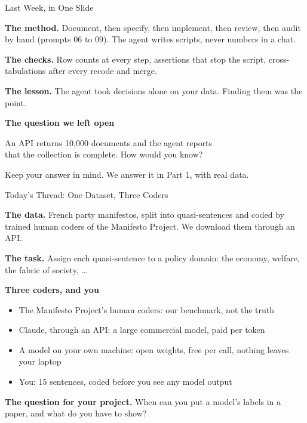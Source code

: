 
\begin{frame}{Last Week, in One Slide}

\small
\textbf{The method.} Document, then specify, then implement, then review, then audit by hand (prompts 06 to 09). The agent writes scripts, never numbers in a chat.

\vspace{0.25cm}

\textbf{The checks.} Row counts at every step, assertions that stop the script, cross-tabulations after every recode and merge.

\vspace{0.25cm}

\textbf{The lesson.} The agent took decisions alone on your data. Finding them was the point.

\vspace{0.5cm}

\textbf{The question we left open}

\vspace{0.15cm}
\centering
\alert{An API returns 10,000 documents and the agent reports\\ that the collection is complete. How would you know?}

\vspace{0.2cm}
{\small Keep your answer in mind. We answer it in Part 1, with real data.}

\end{frame}

\begin{frame}{Today's Thread: One Dataset, Three Coders}

\small
\textbf{The data.} French party manifestos, split into quasi-sentences and coded by trained human coders of the Manifesto Project. We download them through an API.

\vspace{0.3cm}

\textbf{The task.} Assign each quasi-sentence to a policy domain: the economy, welfare, the fabric of society, \dots

\vspace{0.3cm}

\textbf{Three coders, and you}
\begin{itemize}
    \setlength{\itemsep}{2pt}
    \item The Manifesto Project's human coders: our benchmark, not the truth
    \item Claude, through an API: a large commercial model, paid per token
    \item A model on your own machine: open weights, free per call, nothing leaves your laptop
    \item You: 15 sentences, coded before you see any model output
\end{itemize}

\vspace{0.3cm}

\textbf{The question for your project.} When can you put a model's labels in a paper, and what do you have to show?

\end{frame}

